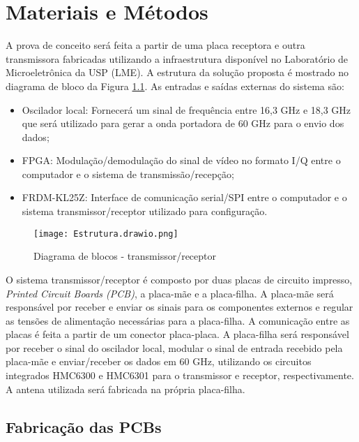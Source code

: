 \chapter{Materiais e Métodos}

A prova de conceito será feita a partir de uma placa receptora e outra transmissora fabricadas utilizando a infraestrutura disponível no Laboratório de Microeletrônica da USP (LME). A estrutura da solução proposta é mostrado no diagrama de bloco da Figura \ref{blocos}. As entradas e saídas externas do sistema são:
\begin{itemize}
    \item Oscilador local: Fornecerá um sinal de frequência entre 16,3 GHz e 18,3 GHz que será utilizado para gerar a onda portadora de 60 GHz para o envio dos dados;
    \item FPGA: Modulação/demodulação do sinal de vídeo no formato I/Q entre o computador e o sistema de transmissão/recepção;
    \item FRDM-KL25Z: Interface de comunicação serial/SPI entre o computador e o sistema transmissor/receptor utilizado para configuração.
\end{itemize}

\begin{figure}[ht]
\centering
\caption{Diagrama de blocos - transmissor/receptor}
\texttt{[image: Estrutura.drawio.png]}

\centering
\label{blocos}
\end{figure}

O sistema transmissor/receptor é composto por duas placas de circuito impresso, \textit{Printed Circuit Boards (PCB)}, a placa-mãe e a placa-filha. A placa-mãe será responsável por receber e enviar os sinais para os componentes externos e regular as tensões de alimentação necessárias para a placa-filha. A comunicação entre as placas é feita a partir de um conector placa-placa. A placa-filha será responsável por receber o sinal do oscilador local, modular o sinal de entrada recebido pela placa-mãe e enviar/receber os dados em 60 GHz, utilizando os circuitos integrados HMC6300 e HMC6301 para o transmissor e receptor, respectivamente. A antena utilizada será fabricada na própria placa-filha.

\section{Fabricação das PCBs}

